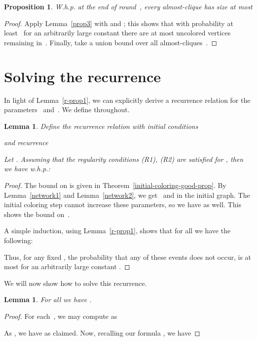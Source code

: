 \documentclass[11pt]{amsart}
\newtheorem{proposition}[theorem]{Proposition}
\newtheorem{lemma}[theorem]{Lemma}
\begin{document}
\begin{proposition}
\label{aprop2}
W.h.p. at the end of round~, every almost-clique  has size at most

\end{proposition}
\begin{proof}
 Apply Lemma~\ref{prop3} with  and ; this shows that with probability at least~ for an arbitrarily large constant   there are at most  uncolored vertices remaining in~. Finally, take a union bound over all almost-cliques~.
\end{proof}

\section{Solving the recurrence}
\label{sec:solver}
In light of Lemma~\ref{r-prop1}, we can explicitly derive a recurrence relation for the parameters~ and~. We define  throughout.

\begin{lemma}
\label{r-prop0}
Define the recurrence relation with initial conditions

and recurrence


Let . Assuming that the regularity conditions (R1), (R2) are satisfied for , then we have w.h.p.:

\end{lemma}
\begin{proof}
The bound on  is given in Theorem~\ref{initial-coloring-good-prop}. By Lemma~\ref{network1} and Lemma~\ref{network2}, we get~ and   in the initial graph. The initial coloring step cannot increase these parameters, so we have  as well. This shows the bound on~.


A simple induction, using Lemma~\ref{r-prop1}, shows that for all  we have the following:


Thus, for any fixed , the probability that any of these events does not occur, is at most  for an arbitrarily large constant .
\end{proof}

We will now show how to solve this recurrence.
\begin{lemma}
\label{r-prop3}
For all  we have .
\end{lemma}
\begin{proof}
For each~, we may compute  as


As  , we have  as claimed. Now, recalling our formula , we have 

\end{proof}
\end{document}
